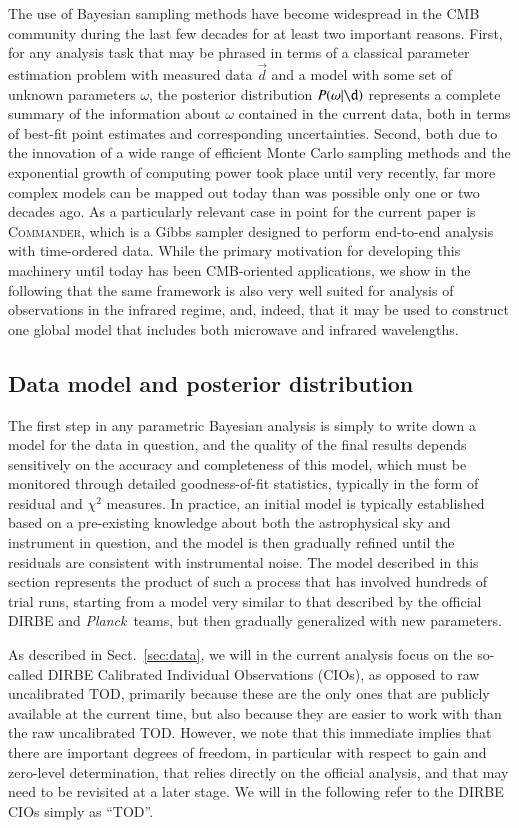\documentclass{aa}
\def\commander{\textsc{Commander}}
\def\Planck{\textit{Planck}}
\newcommand{\dv}[0]{\vec{d}}
\begin{document}
The use of Bayesian sampling methods have become widespread in the CMB
community during the last few decades for at least two important
reasons. First, for any analysis task that may be phrased in terms of
a classical parameter estimation problem with measured data $\dv$ and a
model with some set of unknown parameters $\omega$, the posterior
distribution $P(\omega|\d)$ represents a complete summary of the
information about $\omega$ contained in the current data, both in
terms of best-fit point estimates and corresponding
uncertainties. Second, both due to the innovation of a wide range of
efficient Monte Carlo sampling methods and the exponential growth of
computing power took place until very recently, far more complex
models can be mapped out today than was possible only one or two
decades ago. As a particularly relevant case in point for the current
paper is \commander, which is a Gibbs sampler designed to perform
end-to-end analysis with time-ordered data. While the primary
motivation for developing this machinery until today has been
CMB-oriented applications, we show in the following that the same
framework is also very well suited for analysis of observations in the
infrared regime, and, indeed, that it may be used to construct one
global model that includes both microwave and infrared wavelengths.

\subsection{Data model and posterior distribution}
\label{sec:datamodel}

The first step in any parametric Bayesian analysis is simply to write
down a model for the data in question, and the quality of the final
results depends sensitively on the accuracy and completeness of this
model, which must be monitored through detailed goodness-of-fit
statistics, typically in the form of residual and $\chi^2$
measures. In practice, an initial model is typically established based
on a pre-existing knowledge about both the astrophysical sky and
instrument in question, and the model is then gradually refined until
the residuals are consistent with instrumental noise. The model
described in this section represents the product of such a process
that has involved hundreds of trial runs, starting from a model very
similar to that described by the official DIRBE and \Planck\ teams,
but then gradually generalized with new parameters.

As described in Sect.~\ref{sec:data}, we will in the current analysis
focus on the so-called DIRBE Calibrated Individual Observations
(CIOs), as opposed to raw uncalibrated TOD, primarily because these
are the only ones that are publicly available at the current time, but
also because they are easier to work with than the raw uncalibrated
TOD. However, we note that this immediate implies that there are
important degrees of freedom, in particular with respect to gain and
zero-level determination, that relies directly on the official
analysis, and that may need to be revisited at a later stage. We will
in the following refer to the DIRBE CIOs simply as ``TOD''.
\end{document}
